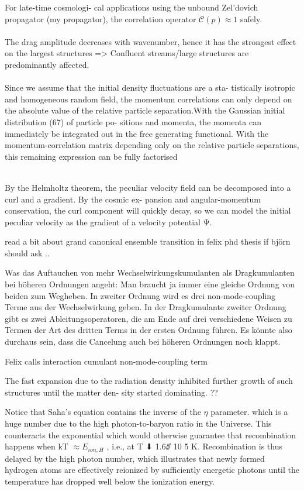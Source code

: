 \begin{description}
\item[Zel'dovich inside KFT]
 For late-time cosmologi-
cal applications using the unbound Zel’dovich propagator (my propagator), the correlation operator $\mathcal{C}(p)\approx1$ safely.\\
\\
The drag amplitude decreases with wavenumber, hence it has the strongest effect on the largest structures => Confluent streams/large structures are predominantly affected.\\
\\
Since
we assume that the initial density fluctuations are a sta-
tistically isotropic and homogeneous random field, the
momentum correlations can only depend on the absolute
value of the relative particle separation.With the Gaussian initial distribution (67) of particle po-
sitions and momenta, the momenta can immediately be
integrated out in the free generating functional. With the momentum-correlation matrix depending only
on the relative particle separations, this remaining expression can be fully factorised\\
\\
\item[Different things]
\item By
the Helmholtz theorem, the peculiar velocity field can be
decomposed into a curl and a gradient. By the cosmic ex-
pansion and angular-momentum conservation, the curl
component will quickly decay, so we can model the initial
peculiar velocity as the gradient of a velocity potential Ψ.
\item read a bit about grand canonical ensemble transition in felix phd thesis if björn should ask ..
\item Was das Auftauchen von mehr Wechselwirkungskumulanten als Dragkumulanten bei höheren Ordnungen angeht: Man braucht ja immer eine gleiche Ordnung von beiden zum Wegheben. In zweiter Ordnung wird es drei non-mode-coupling Terme aus der Wechselwirkung geben. In der Dragkumulante zweiter Ordnung gibt es zwei Ableitungsoperatoren, die am Ende auf drei verschiedene Weisen zu Termen der Art des dritten Terms in der ersten Ordnung führen. Es könnte also durchaus sein, dass die Cancelung auch bei höheren Ordnungen noch klappt.

\item Felix calls interaction cumulant non-mode-coupling term
\item The fast expansion due to the radiation density inhibited
further growth of such structures until the matter den-
sity started dominating. ??
\item Notice that Saha’s equation contains the inverse of the
$\eta$ parameter. which is a huge number due to
the high photon-to-baryon ratio in the Universe. This
counteracts the exponential which would otherwise
guarantee that recombination happens when kT  $\approx E_{ion,H}$ , i.e.,
at T ⬇ 1.6⫻ 10 5 K. Recombination is thus delayed by the
high photon number, which illustrates that newly formed
hydrogen atoms are effectively reionized by sufficiently energetic photons until the temperature has dropped
well below the ionization energy.


\end{description}

